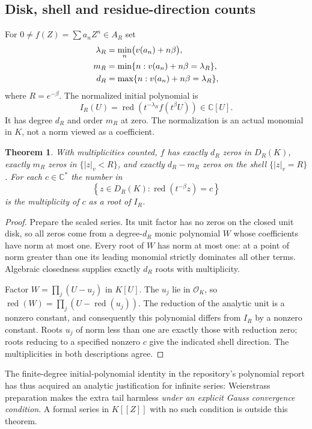 \documentclass[11pt,a4paper]{article}
\numberwithin{equation}{section}
\newtheorem{theorem}{Theorem}[section]
\theoremstyle{definition}
\theoremstyle{remark}
\newcommand{\C}{\mathbb C}
\newcommand{\OO}{\mathcal O}
\newcommand{\vabs}[1]{\lvert#1\rvert_v}
\newcommand{\red}{\operatorname{red}}
\begin{document}
\subsection{Disk, shell and residue-direction counts}
For $0\ne f(Z)=\sum a_nZ^n\in A_R$ set
\begin{align}
 \lambda_R&=\min_n\bigl(v(a_n)+n\beta\bigr),\notag\\
 m_R&=\min\{n:v(a_n)+n\beta=\lambda_R\},\label{eq:md}\\
 d_R&=\max\{n:v(a_n)+n\beta=\lambda_R\},\notag
\end{align}
where $R=e^{-\beta}$. The normalized initial polynomial is
\begin{equation}\label{eq:initial}
 I_R(U)=\red\left(t^{-\lambda_R}f(t^\beta U)\right)\in\C[U].
\end{equation}
It has degree $d_R$ and order $m_R$ at zero. The normalization is an actual
monomial in $K$, not a norm viewed as a coefficient.

\begin{theorem}\label{thm:rootcounts}
With multiplicities counted, $f$ has exactly $d_R$ zeros in $D_R(K)$, exactly
$m_R$ zeros in $\{\vabs z<R\}$, and exactly $d_R-m_R$ zeros on the shell
$\{\vabs z=R\}$. For each $c\in\C^*$ the number in
\[
 \left\{z\in D_R(K):\red(t^{-\beta}z)=c\right\}
\]
is the multiplicity of $c$ as a root of $I_R$.
\end{theorem}
\begin{proof}
Prepare the scaled series. Its unit factor has no zeros on the closed unit
disk, so all zeros come from a degree-$d_R$ monic polynomial $W$ whose
coefficients have norm at most one. Every root of $W$ has norm at most one:
at a point of norm greater than one its leading monomial strictly dominates all
other terms. Algebraic closedness supplies exactly $d_R$ roots with
multiplicity.

Factor $W=\prod_j(U-u_j)$ in $K[U]$. The $u_j$ lie in $\OO_K$, so
$\red(W)=\prod_j(U-\red(u_j))$. The reduction of the analytic unit is a
nonzero constant, and consequently this polynomial differs from $I_R$ by a
nonzero constant. Roots $u_j$ of norm less than one are exactly those with
reduction zero; roots reducing to a specified nonzero $c$ give the indicated
shell direction. The multiplicities in both descriptions agree.
\end{proof}

The finite-degree initial-polynomial identity in the repository's polynomial
report has thus acquired an analytic justification for infinite series:
Weierstrass preparation makes the extra tail harmless \emph{under an explicit
Gauss convergence condition}. A formal series in $K[[Z]]$ with no such condition
is outside this theorem.
\end{document}
